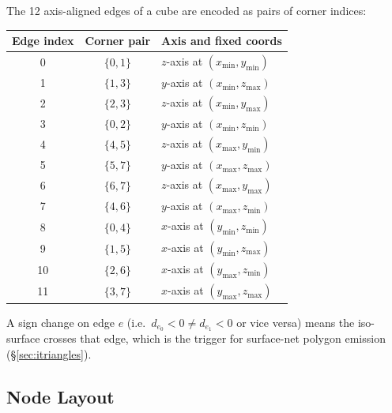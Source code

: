 \documentclass[10pt,a4paper]{article}
\begin{document}
The 12 axis-aligned edges of a cube are encoded as pairs of corner
indices:

\begin{center}
\small
\begin{tabular}{c|c|l}
  \toprule
  Edge index & Corner pair & Axis and fixed coords\\
  \midrule
  0  & $\{0,1\}$ & $z$-axis at $(x_{\min}, y_{\min})$\\
  1  & $\{1,3\}$ & $y$-axis at $(x_{\min}, z_{\max})$\\
  2  & $\{2,3\}$ & $z$-axis at $(x_{\min}, y_{\max})$\\
  3  & $\{0,2\}$ & $y$-axis at $(x_{\min}, z_{\min})$\\
  4  & $\{4,5\}$ & $z$-axis at $(x_{\max}, y_{\min})$\\
  5  & $\{5,7\}$ & $y$-axis at $(x_{\max}, z_{\max})$\\
  6  & $\{6,7\}$ & $z$-axis at $(x_{\max}, y_{\max})$\\
  7  & $\{4,6\}$ & $y$-axis at $(x_{\max}, z_{\min})$\\
  8  & $\{0,4\}$ & $x$-axis at $(y_{\min}, z_{\min})$\\
  9  & $\{1,5\}$ & $x$-axis at $(y_{\min}, z_{\max})$\\
  10 & $\{2,6\}$ & $x$-axis at $(y_{\max}, z_{\min})$\\
  11 & $\{3,7\}$ & $x$-axis at $(y_{\max}, z_{\max})$\\
  \bottomrule
\end{tabular}
\end{center}

\noindent
A sign change on edge $e$ (i.e.\ $d_{e_0} < 0 \neq d_{e_1} < 0$ or
vice versa) means the iso-surface crosses that edge, which is the
trigger for surface-net polygon emission (\S\ref{sec:itriangles}).

\subsection{Node Layout}
\end{document}
